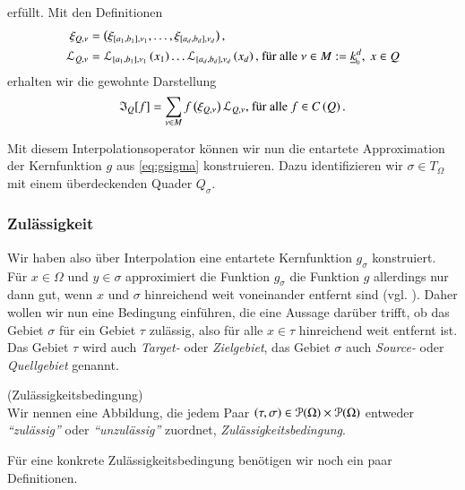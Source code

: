       erfüllt. Mit den Definitionen
      \begin{align*}
	\xi_{Q ,\nu} &= \left(\xi_{[a_1,b_1],\nu_1} ,    \dots , \xi_{[a_d,b_d],\nu_d}\right),\\
	\lag_{Q,\nu} &= \lag_{[a_1,b_1],\nu_1}\left(x_1\right) \dots  \lag_{[a_d,b_d],\nu_d}\left(x_d\right) \text{, für alle } \nu \in M := \nullhaken{k}^d, \ x \in Q
      \end{align*}
      erhalten wir die gewohnte Darstellung
      \begin{equation*}
	\mathfrak{I}_Q[f] = \sum_{\nu \in M} f\left(\xi_{Q,\nu}\right)\mathcal{L}_{Q,\nu} \text{, für alle } f \in C\left(Q\right).
      \end{equation*}
      
      Mit diesem Interpolationsoperator können wir nun die entartete Approximation der Kernfunktion $g$ aus \autoref{eq:gsigma} konstruieren. Dazu identifizieren wir $\sigma \in T_\Omega$
      mit einem überdeckenden Quader $Q_\sigma$.
    
    \subsubsection{Zulässigkeit}
    \label{sec:zul}
      Wir haben also über Interpolation eine entartete Kernfunktion $g_\sigma$ konstruiert. Für $x \in \Omega$ und $y \in \sigma$ approximiert die Funktion $g_\sigma$ die Funktion $g$ allerdings 
      nur dann gut, wenn $x$ und $\sigma$ hinreichend weit voneinander entfernt sind (vgl. \citet{h2diss, nichtlokop}). 
      Daher wollen wir nun eine Bedingung einführen, die eine Aussage darüber trifft, ob das Gebiet $\sigma$ für ein Gebiet $\tau$ zulässig, also für alle $x \in \tau$
      hinreichend weit entfernt ist. Das Gebiet $\tau$ wird auch \textit{Target-} oder \textit{Zielgebiet}, das Gebiet $\sigma$ auch \textit{Source-} oder \textit{Quellgebiet} genannt.
      
      \begin{defn}
	(Zulässigkeitsbedingung)\\
	Wir nennen eine Abbildung, die jedem Paar $\left(\tau, \sigma\right) \in \mathcal{P}(\Omega) \times \mathcal{P}(\Omega)$ entweder \textit{``zulässig''} oder \textit{``unzulässig''} zuordnet, 
	\textit{Zulässigkeitsbedingung}.       
      \end{defn}
      
      Für eine konkrete Zulässigkeitsbedingung benötigen wir noch ein paar Definitionen.
            
